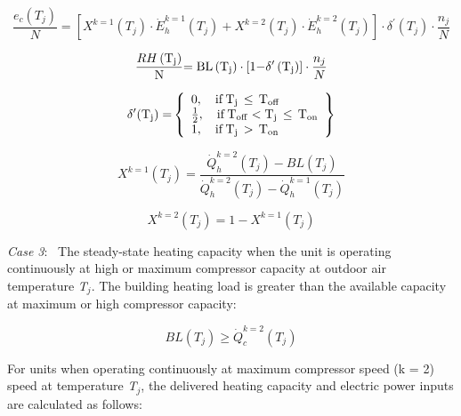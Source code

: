 \begin{equation}
\frac{{{e_c}({T_j})}}{N} = \left[ {{X^{k = 1}}({T_j}) \cdot \dot E_h^{k = 1}({T_j}) + {X^{k = 2}}({T_j}) \cdot \dot E_h^{k = 2}({T_j})} \right] \cdot {\delta ^\prime}({T_j}) \cdot \frac{{{n_j}}}{N}
\end{equation}

\begin{equation}
\frac{{RH\left( {{{\rm{T}}_{\rm{j}}}} \right)}}{{\rm{N}}}{\rm{ = BL}}\left( {{{\rm{T}}_{\rm{j}}}} \right) \cdot \left[ {{\rm{1 - }}{{\rm{\delta }}^\prime}\left( {{{\rm{T}}_{\rm{j}}}} \right)} \right] \cdot \frac{{{n_j}}}{N}
\end{equation}

\begin{equation}
{\delta ^\prime}{\rm{(}}{{\rm{T}}_{\rm{j}}}{\rm{) = }}\left\{ \begin{array}{l}0,\quad {\rm{if}}\,{{\rm{T}}_{\rm{j}}}\, \le \,{{\rm{T}}_{{\rm{off}}}}\,\\ {\textstyle{1 \over 2}},\quad {\rm{if}}\,{{\rm{T}}_{{\rm{off}}}} < {{\rm{T}}_{\rm{j}}}\, \le \,{{\rm{T}}_{{\rm{on}}}}\\ 1,\quad {\rm{if}}\,{{\rm{T}}_{\rm{j}}}\, > \,{{\rm{T}}_{{\rm{on}}}}\end{array} \right\}
\end{equation}

\begin{equation}
{X^{k = 1}}({T_j}) = \frac{{\dot Q_h^{k = 2}({T_j}) - BL({T_j})}}{{\dot Q_h^{k = 2}({T_j}) - \dot Q_h^{k = 1}({T_j})}}
\end{equation}

\begin{equation}
{X^{k = 2}}({T_j}) = 1 - {X^{k = 1}}({T_j})
\end{equation}

\emph{Case 3}:~ The steady-state heating capacity when the unit is operating continuously at high or maximum compressor capacity at outdoor air temperature \emph{T\(_{j}\)}. The building heating load is greater than the available capacity at maximum or high compressor capacity:

\begin{equation}
BL\left( {{T_j}} \right) \ge \dot Q_c^{k = 2}\left( {{T_j}} \right)
\end{equation}

For units when operating continuously at maximum compressor speed (k = 2) speed at temperature \emph{T\(_{j}\)}, the delivered heating capacity and electric power inputs are calculated as follows:

